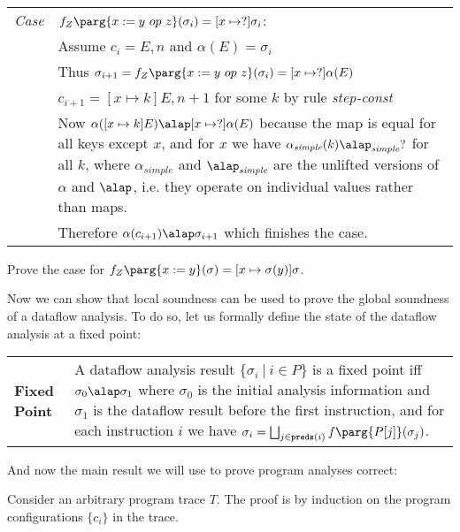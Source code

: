\documentclass[11pt]{article}
\newcommand{\definition}[2]
  {\bigskip
   \begin{tabular}{p{1.5in}p{4.0in}}
        \textbf{#1} & #2 \\
        \end{tabular}
  }
\begin{document}
\begin{tabularx}{\textwidth}{lX}
\emph{Case} & $f_Z\parg{x := y ~op~ z}(\sigma_i) = [x \mapsto ?]\sigma_i$: \\
 & Assume $c_i = E,n$ and $\alpha(E) = \sigma_i$ \\
 & Thus $\sigma_{i+1} = f_Z\parg{x := y ~op~ z}(\sigma_i) = [x \mapsto ?]\alpha(E)$ \\
 & $c_{i+1} = [x \mapsto k]E,n+1$ for some $k$ by rule \textit{step-const} \\
 &  Now $\alpha([x \mapsto k]E) \alap [x \mapsto ?]\alpha(E)$ because the map is equal for all keys except $x$, and for $x$ we have $\alpha_\textit{simple}(k) \alap_\textit{simple} ?$ for all $k$, where $\alpha_\textit{simple}$ and $\alap_\textit{simple}$ are the unlifted versions of $\alpha$ and $\alap$, i.e. they operate on individual values rather than maps. \\
&  Therefore $\alpha(c_{i+1}) \alap \sigma_{i+1}$ which finishes the case. \\
 \end{tabularx}

  Prove the case for $f_Z\parg{x := y}(\sigma) = [x \mapsto \sigma(y)]\sigma$.



Now we can show that local soundness can be used to prove the global soundness of a dataflow analysis.  To do so, let us formally define the state of the dataflow analysis at a fixed point:

\definition{Fixed Point}{A dataflow analysis result $\{ \sigma_i ~|~ i \in P \}$ is a fixed point iff $\sigma_0 \alap \sigma_1$ where $\sigma_0$ is the initial analysis information and $\sigma_1$ is the dataflow result before the first instruction, and for each instruction $i$ we have $\sigma_i = \bigsqcup_{j \in \mathtt{preds}(i)} f\parg{P[j]}(\sigma_j)$.}

\noindent And now the main result we will use to prove program analyses correct:


\proof Consider an arbitrary program trace $T$.  The proof is by induction on the program configurations $\{ c_i \}$ in the trace.\\[1ex]
\end{document}
